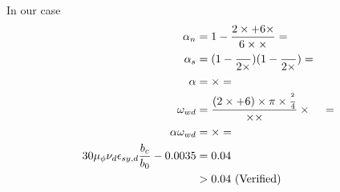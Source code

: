 In our case
\begin{align*}
  \alpha_n &= 1 - \frac{2 \times \g{bi} + 6 \times
             \g{bi2}}{6 \times \g{b0} \times \g{h0}}  = \g{aln}\\
  \alpha_s &= (1 - \frac{\g{s}}{2 \times \g{b0}})(1-\frac{\g{s}}{2 \times \g{h0}})
             = \g{als}\\
  \alpha &= \g{aln} \times \g{als} = \g{al}\\
  \omega_{wd} &= \frac{(2 \times \g{bi} + 6 \g{bi2}) \times \pi \times
             \frac{\g{phi}^2}{4}}{\g{b0} \times \g{h0} \times \g{s}} \times
                \frac{\g{fyd}}{\g{fcd}}
  &= \g{omwd}\\
  \alpha \omega_{wd} &= \g{al} \times \g{omwd} = \g{alom}\\
  30 \mu_{\phi}\nu_d \epsilon_{sy,d} \frac{b_c}{b_0} - 0.0035 &= 0.04\\
  \g{alom} &> 0.04 \mbox{ (Verified)}\\
\end{align*}